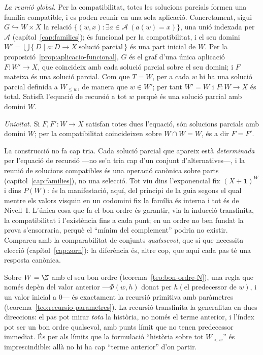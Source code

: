 \begin{prova}
\emph{La reunió global.} Per la compatibilitat, totes les solucions parcials
formen una família compatible, i es poden reunir en una sola aplicació.
Concretament, sigui \(G\hookrightarrow W\times X\) la relació
\(\{(w,x):\exists a\in\mathcal A\ (a(w)=x)\}\), una unió indexada per
\(\mathcal A\) (capítol~\ref{cap:families}); és funcional per la
compatibilitat, i el seu domini \(W'=\bigcup\{\,D\mid a\colon D\to X\
\text{solució parcial}\,\}\) és una part inicial de \(W\). Per la
proposició~\ref{prop:aplicacio-funcional}, \(G\) és el graf d'una única
aplicació \(F\colon W'\to X\), que coincideix amb cada solució parcial sobre
el seu domini; i \(F\) mateixa és una solució parcial. Com que \(T=W\), per a cada \(w\) hi ha una solució parcial
definida a \(W_{\le w}\), de manera que \(w\in W'\); per tant \(W'=W\) i
\(F\colon W\to X\) és total. Satisfà l'equació de recursió a tot \(w\) perquè
és una solució parcial amb domini \(W\).

\emph{Unicitat.} Si \(F,F'\colon W\to X\) satisfan totes dues l'equació, són
solucions parcials amb domini \(W\); per la compatibilitat coincideixen sobre
\(W\cap W=W\), és a dir \(F=F'\).
\end{prova}

\begin{observacio}\label{obs:recursio-sense-eleccio}
La construcció no fa cap tria. Cada solució parcial que apareix està
\emph{determinada} per l'equació de recursió ---no se'n tria cap d'un conjunt
d'alternatives---, i la reunió de solucions compatibles és una operació
canònica sobre parts (capítol~\ref{cap:families}), no una selecció. Tot viu
dins l'exponencial fix \((X+\mathbf1)^{W}\) i dins \(P(W)\): és la
manifestació, aquí, del principi de la guia segons el qual mentre els valors
visquin en un codomini fix la família és interna i tot és de Nivell~I. L'única
cosa que fa el bon ordre és garantir, via la inducció transfinita, la
compatibilitat i l'existència fins a cada punt; en un ordre no ben fundat la
prova s'ensorraria, perquè el \enquote{mínim del complement} podria no
existir. Compareu amb la comparabilitat de conjunts \emph{qualssevol}, que sí
que necessita elecció (capítol~\ref{cap:zorn}): la diferència és, altre cop,
que aquí cada pas té una resposta canònica.
\end{observacio}

\begin{observacio}\label{obs:recursio-N-cas}
Sobre \(W=\N\) amb el seu bon ordre (teorema~\ref{teo:bon-ordre-N}), una regla
que només depèn del valor anterior ---\(\Phi(w,h)\) donat per \(h(\text{el
predecessor de }w)\), i un valor inicial a \(0\)--- és exactament la recursió
primitiva amb paràmetres (teorema~\ref{teo:recursio-parametres}). La recursió
transfinita la generalitza en dues direccions: el pas pot mirar \emph{tota} la
història, no només el terme anterior, i l'índex pot ser un bon ordre qualsevol,
amb punts límit que no tenen predecessor immediat. És per als límits que la
formulació \enquote{història sobre tot \(W_{<w}\)} és imprescindible: allà no
hi ha cap \enquote{terme anterior} d'on partir.
\end{observacio}

